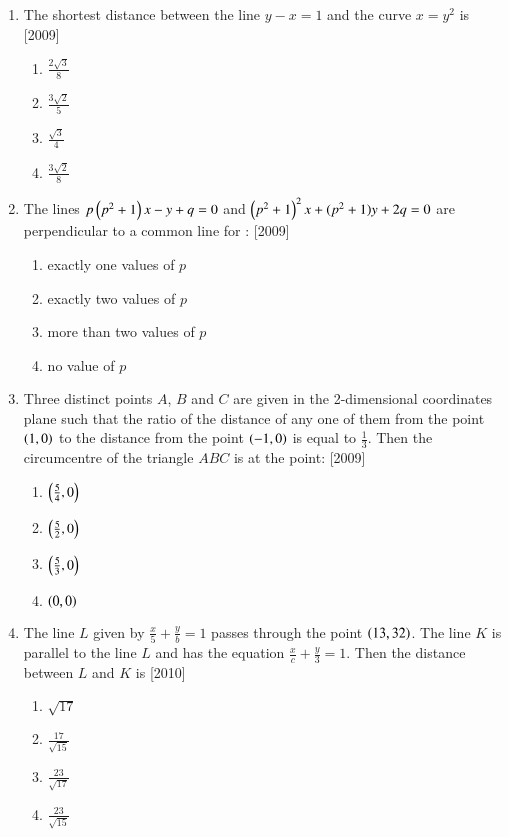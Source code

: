 \documentclass[journal,12pt,twocolumn]{IEEEtran}
\theoremstyle{remark}
\begin{document}
\begin{enumerate}
\item The shortest distance between the line $y- x =1$ and the 
curve $x=y^{2}$ is \hfill{[2009]}
\begin{multicols}{4}
\begin{enumerate}[label=(\alph*)]
\item $\frac{2\sqrt{3}}{8}$
\item $\frac{3\sqrt{2}}{5}$
\item $\frac{\sqrt{3}}{4}$
\item $\frac{3\sqrt{2}}{8}$
\end{enumerate}
\end{multicols}

\item The lines $p\left(p^{2}+1\right)x-y+q=0$ and $\left(p^{2}+1\right)^{2}x+(p^{2}+1)y+ 2q=0$ are perpendicular to a common line for : \hfill{[2009]}
\begin{enumerate}[label=(\alph*)]
\item exactly one values of $p$
\item exactly two values of $p$ 
\item more than two values of $p$ 
\item no value of $p$ 
\end{enumerate}

\item Three distinct points $A$, $B$ and $C$ are given in the 
2-dimensional coordinates plane such that the ratio of the 
distance of any one of them from the point $\left(1, 0\right)$ to the distance from
the point $\left(-1, 0\right)$ is equal to $\frac{1}{3}$. Then the circumcentre of the triangle $ABC$ is at the point: \hfill{[2009]}
\begin{multicols}{4}
\begin{enumerate}[label=(\alph*)]
\item $\left(\frac{5}{4}, 0\right)$
\item $\left(\frac{5}{2}, 0\right)$
\item $\left(\frac{5}{3}, 0\right)$
\item $\left(0, 0\right)$
\end{enumerate}
\end{multicols} 

\item The line $L$ given by $\frac{x}{5}+\frac{y}{b}=1$ passes through the point $\left(13, 32\right)$. The line $K$ is parallel to the line $L$ and has the equation $\frac{x}{c}+\frac{y}{3}=1$. Then the distance between $L$ and $K$ is \hfill{[2010]}
\begin{multicols}{4}
\begin{enumerate}[label=(\alph*)]
\item $\sqrt{17}$
\item $\frac{17}{\sqrt{15}}$
\item $\frac{23}{\sqrt{17}}$
\item $\frac{23}{\sqrt{15}}$
\end{enumerate}
\end{multicols} 


\end{enumerate}
\end{document}
